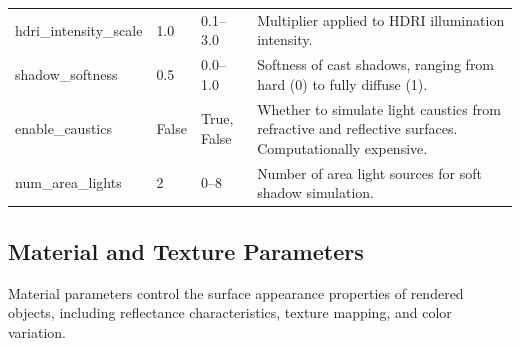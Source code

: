 \begin{longtable}{p{3.5cm}p{2cm}p{2.5cm}p{5.5cm}}
\addlinespace
hdri\_intensity\_scale & 1.0 & 0.1--3.0 & Multiplier applied to HDRI illumination intensity. \\
\addlinespace
shadow\_softness & 0.5 & 0.0--1.0 & Softness of cast shadows, ranging from hard (0) to fully diffuse (1). \\
\addlinespace
enable\_caustics & False & True, False & Whether to simulate light caustics from refractive and reflective surfaces. Computationally expensive. \\
\addlinespace
num\_area\_lights & 2 & 0--8 & Number of area light sources for soft shadow simulation. \\
\end{longtable}

\subsection{Material and Texture Parameters}

Material parameters control the surface appearance properties of rendered objects, including reflectance characteristics, texture mapping, and color variation.


